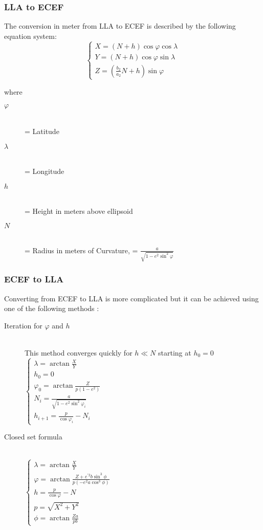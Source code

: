 \subsubsection{LLA to ECEF}
The conversion in meter from LLA to ECEF is described by the following equation
system:
\begin{equation}
\begin{cases} 
X = (N+h)\cos \varphi \cos \lambda
\\ Y = (N+h)\cos \varphi \sin \lambda
\\ Z = (\frac{b_{2}}{a_{2}}N + h) \sin \varphi
\end{cases}
\end{equation}

where

\begin {description}
\item [$\varphi$] \hfill \\ = Latitude
\item [$\lambda$] \hfill \\= Longitude
\item [$h$] \hfill \\= Height in meters above ellipsoid
\item [$N$] \hfill \\= Radius in meters of Curvature,  = $\frac{a}{\sqrt{1-e^{2} \sin^{2} \varphi}}$
\end{description}

\subsubsection{ECEF to LLA}
Converting from ECEF to LLA is more complicated but it can be achieved  using one
of the following methods \cite{datum}:

\begin{description}
\item [Iteration for $\varphi$ and $h$] \hfill \\
This method converges quickly for  $h \ll N$ starting at $h_{0}=0$
\newline
$
\begin{cases}
\lambda = \arctan \frac{X}{Y}
\\ h_{0} = 0
\\ \varphi_{0} = \arctan \frac{Z}{p(1-e^{2})}
\\ N_{i}  = \frac{a} {\sqrt{1-e^{2}\sin^{2} \varphi_{i}}}
\\ h_{i+1} = \frac{p}{\cos \varphi_{i}} - N_{i}
\end{cases}
$
\item [Closed set formula] \hfill \\
$
\begin{cases}
\lambda = \arctan \frac{X}{Y}
\\ \varphi = \arctan \frac{Z + e^{'2}b\sin^{3} \phi}{p(-e^{2}a\cos^3 \phi)}
\\ h = \frac{p}{\cos \varphi} - N
\\ p = \sqrt{X^{2} + Y^{2}}
\\ \phi = \arctan \frac{Za}{pb}
\end{cases}
$
\end{description}

